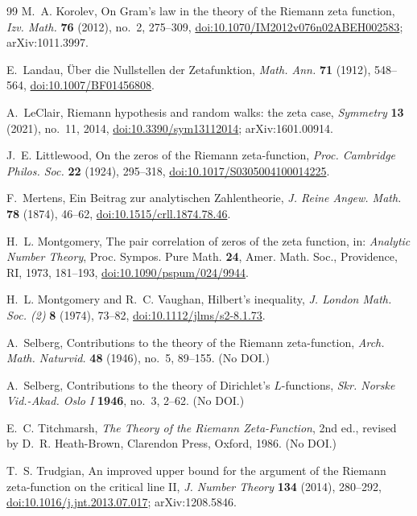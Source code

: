 \documentclass[11pt,reqno]{amsart}
\numberwithin{equation}{section}
\theoremstyle{plain}
\theoremstyle{definition}
\theoremstyle{remark}
\begin{document}
\begin{thebibliography}{99}
M.~A. Korolev, On Gram's law in the theory of the Riemann zeta function, \emph{Izv. Math.} \textbf{76} (2012), no.~2, 275--309, \href{https://doi.org/10.1070/IM2012v076n02ABEH002583}{doi:10.1070/IM2012v076n02ABEH002583}; arXiv:1011.3997.

E.~Landau, \"Uber die Nullstellen der Zetafunktion, \emph{Math. Ann.} \textbf{71} (1912), 548--564, \href{https://doi.org/10.1007/BF01456808}{doi:10.1007/BF01456808}.

A.~LeClair, Riemann hypothesis and random walks: the zeta case, \emph{Symmetry} \textbf{13} (2021), no.~11, 2014, \href{https://doi.org/10.3390/sym13112014}{doi:10.3390/sym13112014}; arXiv:1601.00914.

J.~E. Littlewood, On the zeros of the Riemann zeta-function, \emph{Proc. Cambridge Philos. Soc.} \textbf{22} (1924), 295--318, \href{https://doi.org/10.1017/S0305004100014225}{doi:10.1017/S0305004100014225}.

F.~Mertens, Ein Beitrag zur analytischen Zahlentheorie, \emph{J. Reine Angew. Math.} \textbf{78} (1874), 46--62, \href{https://doi.org/10.1515/crll.1874.78.46}{doi:10.1515/crll.1874.78.46}.

H.~L. Montgomery, The pair correlation of zeros of the zeta function, in: \emph{Analytic Number Theory}, Proc. Sympos. Pure Math. \textbf{24}, Amer. Math. Soc., Providence, RI, 1973, 181--193, \href{https://doi.org/10.1090/pspum/024/9944}{doi:10.1090/pspum/024/9944}.

H.~L. Montgomery and R.~C. Vaughan, Hilbert's inequality, \emph{J. London Math. Soc. (2)} \textbf{8} (1974), 73--82, \href{https://doi.org/10.1112/jlms/s2-8.1.73}{doi:10.1112/jlms/s2-8.1.73}.

A.~Selberg, Contributions to the theory of the Riemann zeta-function, \emph{Arch. Math. Naturvid.} \textbf{48} (1946), no.~5, 89--155. (No DOI.)

A.~Selberg, Contributions to the theory of Dirichlet's $L$-functions, \emph{Skr. Norske Vid.-Akad. Oslo I} \textbf{1946}, no.~3, 2--62. (No DOI.)

E.~C. Titchmarsh, \emph{The Theory of the Riemann Zeta-Function}, 2nd ed., revised by D.~R. Heath-Brown, Clarendon Press, Oxford, 1986. (No DOI.)

T.~S. Trudgian, An improved upper bound for the argument of the Riemann zeta-function on the critical line II, \emph{J. Number Theory} \textbf{134} (2014), 280--292, \href{https://doi.org/10.1016/j.jnt.2013.07.017}{doi:10.1016/j.jnt.2013.07.017}; arXiv:1208.5846.

\end{thebibliography}
\end{document}
